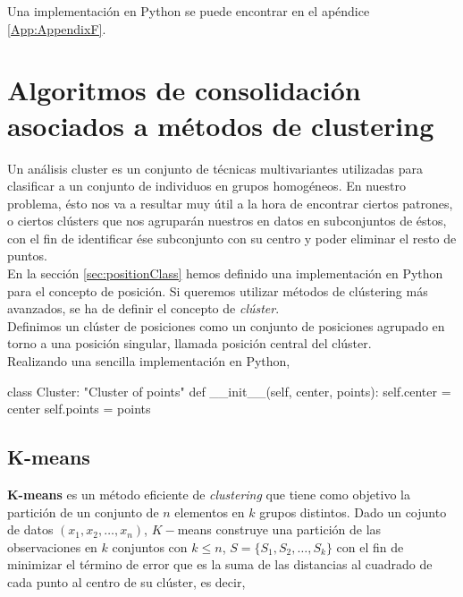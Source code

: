 \documentclass[a4paper, 12pt]{article}
\begin{document}
Una implementaci\'on en Python se puede encontrar en el ap\'endice \ref{App:AppendixF}.\\


\pagebreak
\section{Algoritmos de consolidaci\'on asociados a m\'etodos de clustering}

Un an\'alisis cluster es un conjunto de t\'ecnicas multivariantes utilizadas para clasificar a un conjunto de individuos en grupos homog\'eneos. En nuestro problema, \'esto nos va a resultar muy \'util a la hora de encontrar ciertos patrones, o ciertos cl\'usters que nos agrupar\'an nuestros en datos en subconjuntos de \'estos, con el fin de identificar \'ese subconjunto con su centro y poder eliminar el resto de puntos. \\

En la secci\'on \ref{sec:positionClass} hemos definido una implementaci\'on en Python para el concepto de posici\'on. Si queremos utilizar m\'etodos de cl\'ustering m\'as avanzados, se ha de definir el concepto de \textit{cl\'uster}. \\

Definimos un cl\'uster de posiciones como un conjunto de posiciones agrupado en torno a una posici\'on singular, llamada posici\'on central del cl\'uster.\\

Realizando una sencilla implementaci\'on en Python,


\begin{python}
class Cluster:
	"Cluster of points"
	def __init__(self, center, points):
    	self.center = center
		self.points = points
\end{python}


\subsection{K-means}

\textbf{K-means} es un m\'etodo eficiente de \textit{clustering} que tiene como objetivo la partici\'on de un conjunto de $n$ elementos en $k$ grupos distintos. Dado un cojunto de datos $(x_1, x_2, \ldots , x_n)$, $K-$means construye una partici\'on de las observaciones en $k$ conjuntos con $k\leq n$, $S=\{S_1, S_2, \ldots, S_k\}$ con el fin de minimizar el t\'ermino de error que es la suma de las distancias al cuadrado de cada punto al centro de su cl\'uster, es decir,
\end{document}
